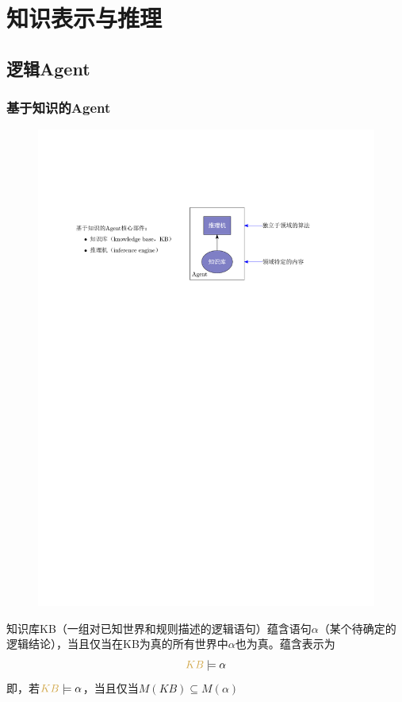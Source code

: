 \section{知识表示与推理}
\subsection{逻辑Agent}
\subsubsection{基于知识的Agent}

\begin{figure}[htbp]
    \centering
    \includegraphics{image/基于知识的Agent.pdf}
\end{figure}

\begin{definition}[蕴含（Entailment）]
    知识库KB（一组对已知世界和规则描述的逻辑语句）蕴含语句$\alpha$（某个待确定的逻辑结论），当且仅当在KB为真的所有世界中$\alpha$也为真。蕴含表示为
    \[
        \textcolor{main1}{KB}\models\alpha 
    \]
    即，若$\textcolor{main1}{KB}\models\alpha $，当且仅当$M(KB)\subseteq M(\alpha)$
\end{definition}
